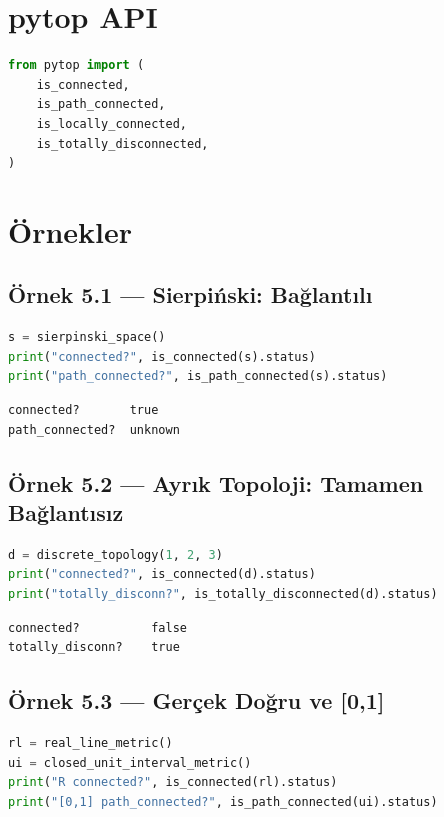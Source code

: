 \section{pytop API}

\begin{lstlisting}[language=Python]
from pytop import (
    is_connected,
    is_path_connected,
    is_locally_connected,
    is_totally_disconnected,
)
\end{lstlisting}

\section{Örnekler}

\subsection*{Örnek 5.1 — Sierpiński: Bağlantılı}

\begin{lstlisting}[language=Python]
s = sierpinski_space()
print("connected?", is_connected(s).status)
print("path_connected?", is_path_connected(s).status)
\end{lstlisting}

\begin{verbatim}
connected?       true
path_connected?  unknown
\end{verbatim}

\subsection*{Örnek 5.2 — Ayrık Topoloji: Tamamen Bağlantısız}

\begin{lstlisting}[language=Python]
d = discrete_topology(1, 2, 3)
print("connected?", is_connected(d).status)
print("totally_disconn?", is_totally_disconnected(d).status)
\end{lstlisting}

\begin{verbatim}
connected?          false
totally_disconn?    true
\end{verbatim}

\subsection*{Örnek 5.3 — Gerçek Doğru ve [0,1]}

\begin{lstlisting}[language=Python]
rl = real_line_metric()
ui = closed_unit_interval_metric()
print("R connected?", is_connected(rl).status)
print("[0,1] path_connected?", is_path_connected(ui).status)
\end{lstlisting}

